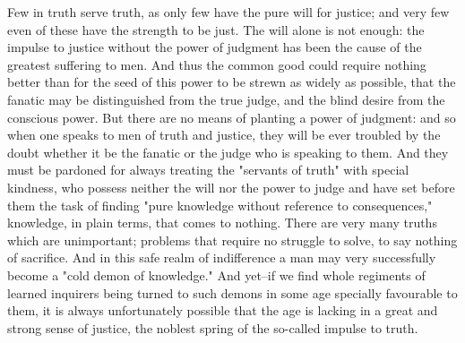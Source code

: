 Few in truth serve truth, as only few have the pure will for justice;
and very few even of these have the strength to be just. The will
alone is not enough: the impulse to justice without the power of
judgment has been the cause of the greatest suffering to men. And
thus the common good could require nothing better than for the seed
of this power to be strewn as widely as possible, that the fanatic
may be distinguished from the true judge, and the blind desire from
the conscious power. But there are no means of planting a power of
judgment: and so when one speaks to men of truth and justice, they
will be ever troubled by the doubt whether it be the fanatic or the
judge who is speaking to them. And they must be pardoned for always
treating the "servants of truth" with special kindness, who possess
neither the will nor the power to judge and have set before them the
task of finding "pure knowledge without reference to consequences,"
knowledge, in plain terms, that comes to nothing. There are very many
truths which are unimportant; problems that require no struggle to
solve, to say nothing of sacrifice. And in this safe realm of
indifference a man may very successfully become a "cold demon of
knowledge." And yet--if we find whole regiments of learned inquirers
being turned to such demons in some age specially favourable to them,
it is always unfortunately possible that the age is lacking in a
great and strong sense of justice, the noblest spring of the
so-called impulse to truth.

